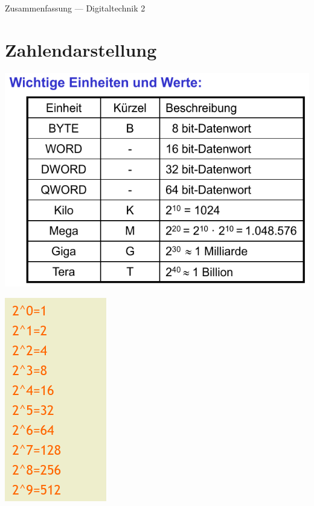 \documentclass[a5paper,12pt,twoside]{scrartcl}
\begin{document}
\sffamily

{\huge\centering
  Zusammenfassung --- Digitaltechnik 2\par
}

\section{Zahlendarstellung}

\begin{minipage}{.48\linewidth}
  \includegraphics[width=\textwidth]{Einheiten}
\end{minipage}\hfill%
\begin{minipage}{.48\linewidth}
  \begin{center}
    \includegraphics[width=.4\textwidth]{Zweierpotenzen}
  \end{center}
\end{minipage}
\end{document}
